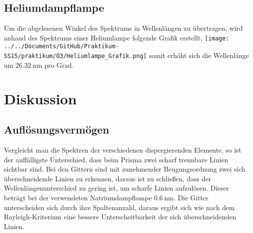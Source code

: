 \subsection{Heliumdampflampe}
Um die abgelesenen Winkel des Spektrums in Wellenlängen zu übertragen, wird anhand des Spektrums einer Heliumlampe folgende Grafik erstellt,
\texttt{[image: ../../Documents/GitHub/Praktikum-SS15/praktikum/O3/Heliumlampe\_Grafik.png]} 
somit erhöht sich die Wellenlänge um $ \SI{26,32}{\nano\meter} $ pro Grad.

\newpage
\section{Diskussion}
\subsection{Auflösungsvermögen}
Vergleicht man die Spektren der verschiedenen dispergierenden Elemente, so ist der auffälligste Unterschied, dass beim Prisma zwei scharf trennbare Linien sichtbar sind. Bei den Gittern sind mit zunehmender Beugungsordnung zwei sich überschneidende Linien zu erkennen, daraus ist zu schließen, dass der Wellenlängenunterschied zu gering ist, um scharfe Linien aufzulösen.
Dieser beträgt bei der verwendeten Natriumdampflampe $ \SI{0,6}{\nano\meter} $. Die Gitter unterscheiden sich durch ihre Spaltenanzahl, daraus ergibt sich wie nach dem Rayleigh-Kriterium eine bessere Unterscheitbarkeit der sich überschneidenden Linien. 
